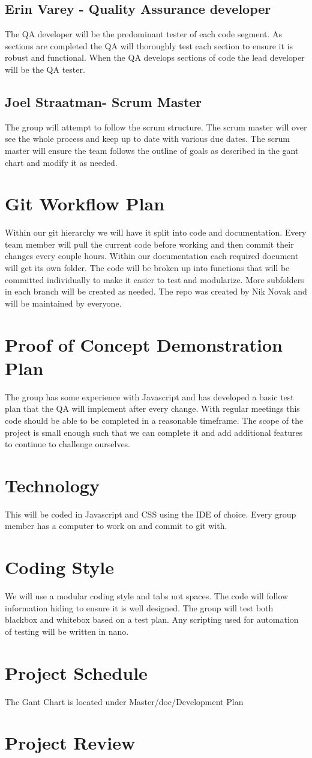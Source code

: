\documentclass{article}
\begin{document}
\subsection{Erin Varey - Quality Assurance developer}
The QA developer will be the predominant tester of each code segment. As sections are completed the QA will thoroughly test each section to ensure it is robust and functional. When the QA develops sections of code the lead developer will be the QA tester. 
\subsection{Joel Straatman- Scrum Master}
The group will attempt to follow the scrum structure. The scrum master will over see the whole process and keep up to date with various due dates. The scrum master will ensure the team follows the outline of goals as described in the gant chart and modify it as needed. 
\section{Git Workflow Plan}
Within our git hierarchy we will have it split into code and documentation. Every team member will pull the current code before working and then commit their changes every couple hours. Within our documentation each required document will get its own folder. The code will be broken up into functions that will be committed individually to make it easier to test and modularize. More subfolders in each branch will be created as needed. The repo was created by Nik Novak and will be maintained by everyone.
\section{Proof of Concept Demonstration Plan}
The group has some experience with Javascript and has developed a basic test plan that the QA will implement after every change. With regular meetings this code should be able to be completed in a reasonable timeframe. The scope of the project is small enough such that we can complete it and add additional features to continue to challenge ourselves.
\section{Technology}
This will be coded in Javascript and CSS using the IDE of choice. Every group member has a computer to work on and commit to git with.
\section{Coding Style}
We will use a modular coding style and tabs not spaces. The code will follow information hiding to ensure it is well designed. The group will test both blackbox and whitebox based on a test plan. Any scripting used for automation of testing will be written in nano.
\section{Project Schedule}
The Gant Chart is located under Master/doc/Development Plan
\section{Project Review}
\end{document}

